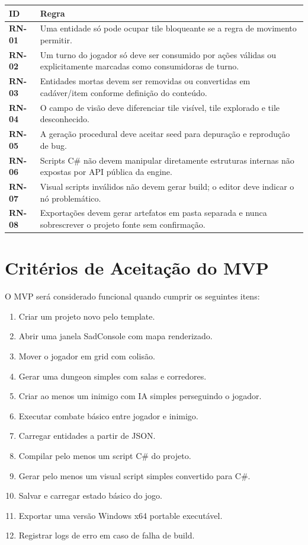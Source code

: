 \documentclass[12pt,a4paper]{article}
\newcommand{\req}[1]{\textbf{#1}}
\begin{document}
\begin{longtable}{p{2.1cm}p{11.8cm}}
\toprule
\textbf{ID} & \textbf{Regra} \\
\midrule
\req{RN-01} & Uma entidade só pode ocupar tile bloqueante se a regra de movimento permitir. \\
\req{RN-02} & Um turno do jogador só deve ser consumido por ações válidas ou explicitamente marcadas como consumidoras de turno. \\
\req{RN-03} & Entidades mortas devem ser removidas ou convertidas em cadáver/item conforme definição do conteúdo. \\
\req{RN-04} & O campo de visão deve diferenciar tile visível, tile explorado e tile desconhecido. \\
\req{RN-05} & A geração procedural deve aceitar seed para depuração e reprodução de bug. \\
\req{RN-06} & Scripts C\# não devem manipular diretamente estruturas internas não expostas por API pública da engine. \\
\req{RN-07} & Visual scripts inválidos não devem gerar build; o editor deve indicar o nó problemático. \\
\req{RN-08} & Exportações devem gerar artefatos em pasta separada e nunca sobrescrever o projeto fonte sem confirmação. \\
\bottomrule
\end{longtable}

\section{Critérios de Aceitação do MVP}

O MVP será considerado funcional quando cumprir os seguintes itens:

\begin{enumerate}[label=\textbf{CA-\arabic*:}]
    \item Criar um projeto novo pelo template.
    \item Abrir uma janela SadConsole com mapa renderizado.
    \item Mover o jogador em grid com colisão.
    \item Gerar uma dungeon simples com salas e corredores.
    \item Criar ao menos um inimigo com IA simples perseguindo o jogador.
    \item Executar combate básico entre jogador e inimigo.
    \item Carregar entidades a partir de JSON.
    \item Compilar pelo menos um script C\# do projeto.
    \item Gerar pelo menos um visual script simples convertido para C\#.
    \item Salvar e carregar estado básico do jogo.
    \item Exportar uma versão Windows x64 portable executável.
    \item Registrar logs de erro em caso de falha de build.
\end{enumerate}
\end{document}
